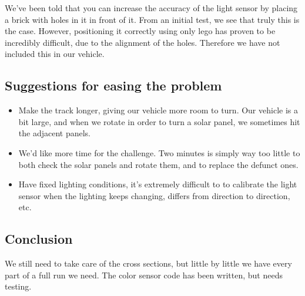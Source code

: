 We've been told that you can increase the accuracy of the light sensor
by placing a brick with holes in it in front of it. From an initial
test, we see that truly this is the case. However, positioning it
correctly using only lego has proven to be incredibly difficult, due to
the alignment of the holes. Therefore we have not included this in our
vehicle.

\subsection{Suggestions for easing the problem}

\begin{itemize}
\itemsep1pt\parskip0pt
\item
  Make the track longer, giving our vehicle more room to turn. Our
  vehicle is a bit large, and when we rotate in order to turn a solar
  panel, we sometimes hit the adjacent panels.
\item
  We'd like more time for the challenge. Two minutes is simply way too
  little to both check the solar panels and rotate them, and to replace
  the defunct ones.
\item
  Have fixed lighting conditions, it's extremely difficult to to
  calibrate the light sensor when the lighting keeps changing, differs
  from direction to direction, etc.
\end{itemize}

\subsection{Conclusion}

We still need to take care of the cross sections, but little by little
we have every part of a full run we need. The color sensor code has been
written, but needs testing.
